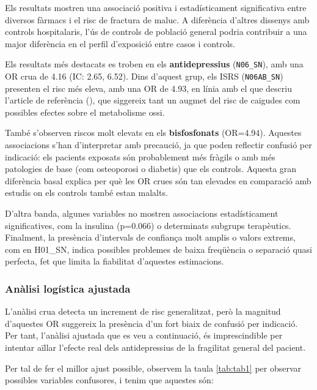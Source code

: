 \documentclass[
]{article}
\begin{document}
Els resultats mostren una associació positiva i estadísticament
significativa entre diversos fàrmacs i el risc de fractura de maluc. A
diferència d'altres dissenys amb controls hospitalaris, l'ús de controls
de població general podria contribuir a una major diferència en el
perfil d'exposició entre casos i controls.

Els resultats més destacats es troben en els \textbf{antidepressius}
(\texttt{N06\_SN}), amb una OR crua de 4.16 (IC: 2.65, 6.52). Dins
d'aquest grup, els ISRS (\texttt{N06AB\_SN}) presenten el risc més
eleva, amb una OR de 4.93, en línia amb el que descriu l'article de
referència (), que
siggereix tant un augmet del risc de caigudes com possibles efectes
sobre el metabolisme ossi.

També s'observen riscos molt elevats en els \textbf{bisfosfonats}
(OR=4.94). Aquestes associacions s'han d'interpretar amb precaució, ja
que poden reflectir confusió per indicació: els pacients exposats són
probablement més fràgils o amb més patologies de base (com osteoporosi o
diabetis) que els controls. Aquesta gran diferència basal explica per
què les OR crues són tan elevades en comparació amb estudis on els
controls també estan malalts.

D'altra banda, algunes variables no mostren associacions estadísticament
significatives, com la insulina (p=0.066) o determinats subgrups
terapèutics. Finalment, la presència d'intervals de confiança molt
amplis o valors extrems, com en H01\_SN, indica possibles problemes de
baixa freqüència o separació quasi perfecta, fet que limita la
fiabilitat d'aquestes estimacions.

\subsubsection{Anàlisi logística
ajustada}\label{anuxe0lisi-loguxedstica-ajustada}

L'anàlisi crua detecta un increment de risc generalitzat, però la
magnitud d'aquestes OR suggereix la presència d'un fort biaix de
confusió per indicació. Per tant, l'anàlisi ajustada que es veu a
continuació, és imprescindible per intentar aïllar l'efecte real dels
antidepressius de la fragilitat general del pacient.

Per tal de fer el millor ajust possible, observem la taula
\ref{tab:tab1} per observar possibles variables confusores, i tenim que
aquestes són:
\end{document}

